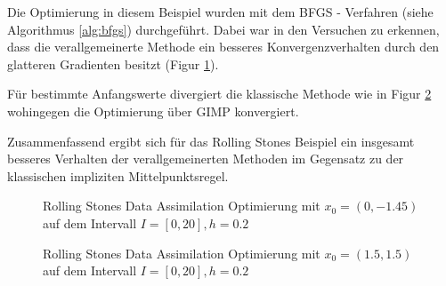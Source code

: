 Die Optimierung in diesem Beispiel wurden mit dem BFGS - Verfahren (siehe Algorithmus \ref{alg:bfgs}) durchgeführt. Dabei war in den Versuchen zu erkennen, dass die verallgemeinerte Methode ein besseres Konvergenzverhalten durch den glatteren Gradienten besitzt (Figur \ref{fig:rollingStonesOpt2}).

Für bestimmte Anfangswerte divergiert die klassische Methode wie in Figur \ref{fig:rollingStonesOpt1} wohingegen die Optimierung über GIMP konvergiert. 

Zusammenfassend ergibt sich für das Rolling Stones Beispiel ein insgesamt besseres Verhalten der verallgemeinerten Methoden im Gegensatz zu der klassischen impliziten Mittelpunktsregel.
\begin{figure}[H]
\footnotesize
\centering
\begin{minipage}[b]{0.49\linewidth}

\end{minipage}
\begin{minipage}[b]{0.49\linewidth}

\end{minipage}
\caption{Rolling Stones Data Assimilation Optimierung mit $x_0=(0,-1.45)$ auf dem Intervall $I = [0,20], h=0.2$}
\label{fig:rollingStonesOpt2}
\end{figure}

\begin{figure}[H]
\footnotesize 
\centering
\begin{minipage}[b]{0.49\linewidth}

\end{minipage}
\begin{minipage}[b]{0.49\linewidth}

\end{minipage}
\caption{Rolling Stones Data Assimilation Optimierung mit $x_0=(1.5,1.5)$ auf dem Intervall $I = [0,20], h=0.2$}
\label{fig:rollingStonesOpt1}
\end{figure}


